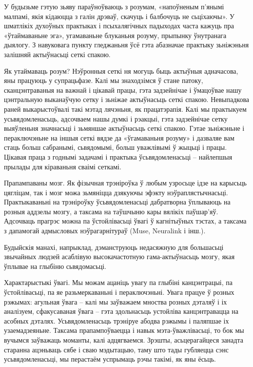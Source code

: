 У будызьме гэтую зьяву параўноўваюць з розумам, «напоўненым п'янымі малпамі, якія кідаюцца з галін дрэваў, скачуць і балбочуць не сьціхаючы». У шматлікіх духоўных практыках і псыхалягічных падыходах часта кажуць пра «ўтаймаваньне эга», угамаваньне блуканьня розуму, прыпынку ўнутранага дыялогу. З навуковага пункту гледжаньня ўсё гэта абазначае практыку зьніжэньня залішняй актыўнасьці сеткі спакою.

Як утаймаваць розум? Нэўронныя сеткі ня могуць быць актыўныя адначасова, яны працуюць у супрацьфазе. Калі мы знаходзімся ў стане патоку, сканцэнтраваныя на важнай і цікавай працы, гэта задзейнічае і ўмацоўвае нашу цэнтральную выканаўчую сетку і зьніжае актыўнасьць сеткі спакою. Невыпадкова раней выкарыстоўвалі такі мэтад лячэньня, як працатэрапія. Калі мы практыкуем усьвядомленасьць, адсочваем нашы думкі і рэакцыі, гэта задзейнічае сетку выяўленьня значнасьці і зьмяншае актыўнасьць сеткі спакою. Гэтае зьніжэньне і пераключэньне на іншыя сеткі вядзе да «ўгамаваньня розуму» і дазваляе вам стаць больш сабранымі, сьвядомымі, больш уважлівымі ў жыцьці і працы. Цікавая праца з годнымі задачамі і практыка ўсьвядомленасьці – найлепшыя прылады для кіраваньня сваімі сеткамі.

Прапампаваны мозг. Як фізычная трэніроўка ў любым узросьце ідзе на карысьць цягліцам, так і мозг можа зьмяніцца дзякуючы эфэкту нэўраплястычнасьці. Практыкаваньні на трэніроўку ўсьвядомленасьці дабратворна ўплываюць на розныя аддзелы мозгу, а таксама на таўшчыню кары вялікіх паўшар'яў. Адсочваць прагрэс можна па ўстойлівасьці ўвагі ў кагнітыўных тэстах, а таксама з дапамогай адмысловых нэўрагарнітураў (Muse, Neuralink і інш.).

Будыйскія манахі, напрыклад, дэманструюць недасяжную для большасьці звычайных людзей асаблівую высокачастотную гама-актыўнасьць мозгу, якая ўплывае на глыбіню сьвядомасьці.

Характарыстыкі ўвагі. Мы можам ацаніць увагу па глыбіні канцэнтрацыі, па ўстойлівасьці, па яе разьмеркаваньні і пераключэньні. Увага працуе ў розных рэжымах: агульная ўвага – калі мы заўважаем мноства розных дэталяў і іх аналізуем, сфакусаваная ўвага – гэта здольнасьць устойліва канцэнтравацца на асобных дэталях. Усьвядомленасьць трэніруе абодва рэжымы і паляпшае іх узаемадзеяньне. Таксама прапампоўваецца і навык мэта-ўважлівасьці, то бок мы вучымся заўважаць моманты, калі адцягваемся. Зрэшты, асьцерагайцеся занадта старанна ацэньваць сябе і сваю мэдытацыю, таму што тады губляецца сэнс усьвядомленасьці, мы перастаём успрымаць рэчы такімі, як яны ёсьць.

